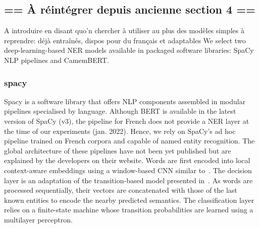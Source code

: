 \subsection{== À réintégrer depuis ancienne section 4 ==}

A introduire en disant quo'n chercher à utiliser au plus des modèles simples à reprendre: déjà entraînés, dispos pour du français et adaptables
We select two deep-learning-based NER models available in packaged software libraries: SpaCy NLP pipelines and CamemBERT.


\subsubsection{spacy}
Spacy is a software library that offers NLP components assembled in modular pipelines specialised by language.
Although BERT is available in the latest version of SpaCy (v3), the pipeline for French does not provide a NER layer at the time of our experiments (jan. 2022).
Hence, we rely on SpaCy's ad hoc pipeline trained on French corpora and capable of named entity recognition.
The global architecture of these pipelines have not been yet published but are explained by the developers on their website.
Words are first encoded into local context-aware embeddings using a window-based CNN similar to~\cite{collobert2011}.
The decision layer is an adaptation of the transition-based model presented in~\cite{lample2016}.
As words are processed sequentially, their vectors are concatenated with those of the last known entities to encode the nearby predicted semantics.
The classification layer relies on a finite-state machine whose transition probabilities are learned using a multilayer perceptron.



